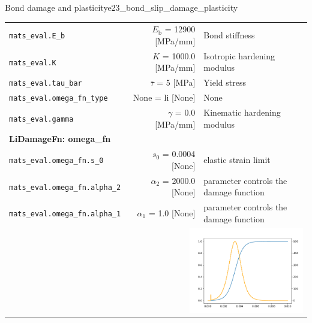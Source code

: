 \documentclass[main.tex]{subfiles}
\begin{document}
\begin{bmcsex}{Bond damage and plasticity}{e23_bond_slip_damage_plasticity}
\begin{center}
{\begin{longtable}{lrp{4cm}}
\texttt{mats\_eval.E\_b} & $E_\mathrm{b}$ = 12900 [MPa/mm] & {\footnotesize Bond stiffness}  \\
            \texttt{mats\_eval.K} & $K$ = 1000.0 [MPa/mm] & {\footnotesize Isotropic hardening modulus}  \\
            \texttt{mats\_eval.tau\_bar} & $\bar{\tau}$ = 5 [MPa] & {\footnotesize Yield stress}  \\
            \texttt{mats\_eval.omega\_fn\_type} & None = li [None] & {\footnotesize None}  \\
            \texttt{mats\_eval.gamma} & $\gamma$ = 0.0 [MPa/mm] & {\footnotesize Kinematic hardening modulus}  \\
            \midrule
\multicolumn{3}{l}{\textbf{\textsf{LiDamageFn: omega\_fn}}}\\

\texttt{mats\_eval.omega\_fn.s\_0} & $s_0$ = 0.0004 [None] & {\footnotesize elastic strain limit}  \\
            \texttt{mats\_eval.omega\_fn.alpha\_2} & $\alpha_2$ = 2000.0 [None] & {\footnotesize parameter controls the damage function}  \\
            \texttt{mats\_eval.omega\_fn.alpha\_1} & $\alpha_1$ = 1.0 [None] & {\footnotesize parameter controls the damage function}  \\
            
\multicolumn{3}{r}{\includegraphics[width=5cm]{examples/e23_bond_slip_damage_plasticity/fig_Li_damage_function.pdf}}\\
\bottomrule 
\end{longtable}
}


\end{center}
\end{bmcsex}
\end{document}
